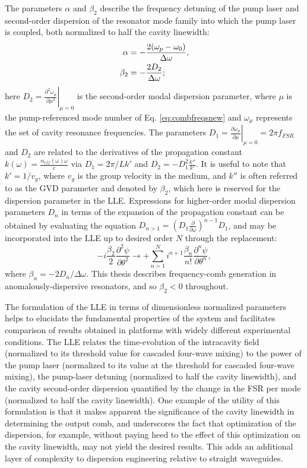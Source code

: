 The parameters $\alpha$ and $\beta_2$ describe the frequency detuning of the pump laser and second-order dispersion of the resonator mode family into which the pump laser is coupled, both normalized to half the cavity linewidth: 
\begin{align}
\alpha&=-\frac{2(\omega_{p}-\omega_0)}{\Delta\omega},\\
\beta_2&=-\frac{2 D_2}{\Delta\omega};
\end{align} here $D_2=\left.\frac{\partial^2\omega_\mu}{\partial \mu^2}\right|_{\mu=0}$ is the second-order modal dispersion parameter, where $\mu$ is the pump-referenced mode number of Eq. \ref{eq:combfreqsnew} and $\omega_\mu$ represents the set of cavity resonance frequencies. The parameters $D_1=\left.\frac{\partial\omega_\mu}{\partial\mu}\right|_{\mu=0}=2\pi f_{FSR}$ and $D_2$ are related to the derivatives of the propagation constant $k(\omega)=\frac{n_{eff}(\omega)\omega}{c}$ via $D_1=2\pi/Lk'$ and $D_2=-D_1^2\frac{k''}{k'}$. It is useful to note that $k'=1/v_g$, where $v_g$ is the group velocity in the medium, and $k''$ is often referred to as the GVD parameter and denoted by $\beta_2$, which here is reserved for the dispersion parameter in the LLE. Expressions for higher-order modal dispersion parameters $D_n$ in terms of the expansion of the propagation constant can be obtained by evaluating the equation $D_{n>1}=(D_1\frac{\partial}{\partial \omega})^{n-1} D_1$, and may be incorporated into the LLE up to desired order $N$ through the replacement:
\begin{equation}
-i\frac{\beta_2}{2}\frac{\partial^2\psi}{\partial\theta^2}\rightarrow +\sum_{n=1}^N i^{n+1} \frac{\beta_n}{n!}\frac{\partial^n\psi}{\partial\theta^n},
\end{equation}
where $\beta_n=-2D_n/\Delta\omega$. This thesis describes frequency-comb generation in anomalously-dispersive resonators, and so $\beta_2<0$ throughout.

The formulation of the LLE in terms of dimensionless normalized parameters helps to elucidate the fundamental properties of the system and facilitates comparison of results obtained in platforms with widely different experimental conditions. The LLE relates the time-evolution of the intracavity field (normalized to its threshold value for cascaded four-wave mixing) to the power of the pump laser (normalized to its value at the threshold for cascaded four-wave mixing), the pump-laser detuning (normalized to half the cavity linewidth), and the cavity second-order dispersion quantified by the change in the FSR per mode (normalized to half the cavity linewidth). One example of the utility of this formulation is that it makes apparent the significance of the cavity linewidth in determining the output comb, and underscores the fact that optimization of the dispersion, for example, without paying heed to the effect of this optimization on the cavity linewidth, may not yield the desired results. This adds an additional layer of complexity to dispersion engineering relative to straight waveguides.

